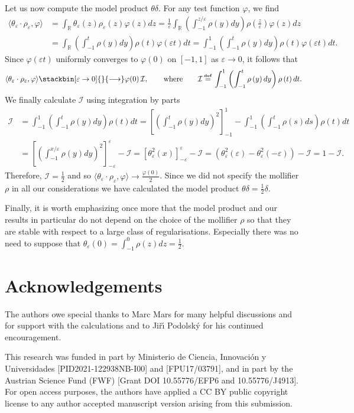 \documentclass[11pt]{article}
\numberwithin{equation}{section}
\def\defi{{\stackrel{\mbox{\tiny {\textbf{def}}}}{\,\, = \,\, }}}
\newcommand{\nn}{\nonumber}
\def\defi{{\stackrel{\mbox{\tiny \textup{\textbf{def}}}}{\,\, = \,\, }}}
\newcommand{\nfi}{\varphi}
\newcommand{\eps}{\varepsilon}
\newcommand{\lp}{\left(}
\newcommand{\rp}{\right)}
\newcommand{\lc}{\left[}
\newcommand{\rc}{\right]}
\newcommand{\la}{\langle}
\newcommand{\ra}{\rangle}
\begin{document}
Let us now compute the model product $\theta\delta$. For any test function $\nfi $, we find
\begin{align}
\nn \la \theta_{\eps}\cdot\rho_{\eps},\nfi\ra&=\int_{\mathbb{R}}\theta_{\eps}(z)\rho_{\eps}(z)\nfi(z)dz=\frac{1}{\eps}\int_{\mathbb{R}}\lp \int_{-1}^{z/\eps}\rho\lp y\rp  dy\rp\rho\lp\frac{z}{\eps}\rp\nfi(z)dz\\
\label{app:A:eq0}&=\int_{\mathbb{R}}\lp \int_{-1}^{ t}\rho\lp y\rp  dy\rp\rho\lp t\rp\nfi(\eps t) dt=\int_{-1}^1\lp \int_{-1}^{ t}\rho\lp y\rp  dy\rp\rho\lp t\rp\nfi(\eps t) dt.
\end{align}
Since $\nfi(\eps t)$ uniformly converges to $\nfi(0)$ on $[-1,1]$ as $\eps\to 0$, it follows that 
\begin{align}
\la \theta_{\eps}\cdot\rho_{\eps},\nfi\ra\stackbin[\eps\rightarrow0]{}{\longrightarrow}\nfi(0)\, \mathcal{I},\qquad \textup{where}\qquad \mathcal{I}\defi \int_{-1}^1\lp \int_{-1}^{ t}\rho\lp y\rp  dy\rp\rho\lp t\rp dt.
\end{align} 
We finally calculate $\mathcal{I}$ using integration by parts
\begin{align}
\nn \mathcal{I}&= \int_{-1}^1\lp \int_{-1}^{ t}\rho\lp y\rp  dy\rp\rho\lp t\rp dt=\lc\lp \int_{-1}^{ t}\rho\lp y\rp  dy \rp^2 \rc^1_{-1}-\int_{-1}^1 \lp \int_{-1}^t \rho(s)ds\rp \rho\lp t\rp  dt\\
\label{app:A:eq1}&=\lc \lp \int_{-1}^{ x/\eps}\rho\lp y\rp  dy \rp^2 \rc^{\eps}_{-\eps}-\mathcal{I}=\lc \theta_{\eps}^2(x) \rc^{\eps}_{-\eps}-\mathcal{I}=\lp \theta_{\eps}^2(\eps)-\theta_{\eps}^2(-\eps) \rp-\mathcal{I}=1-\mathcal{I}.
\end{align}
Therefore, $\mathcal{I}=\frac{1}{2}$ and so $\la \theta_{\eps}\cdot\rho_{\eps},\nfi\ra\to \frac{\nfi(0)}{2}$. Since we did not specify the mollifier $\rho$ in all our considerations we have calculated the model product $\theta\delta=\frac{1}{2}\delta$. 

Finally, it is worth emphasizing once more that 
the model product and our results in particular do not depend on the choice of the mollifier $\rho$ so that they are stable with respect to a large class of regularisations. Especially there was no need to suppose that $\theta_{\eps}(0)=\int_{-1}^0\rho(z)dz=\frac{1}{2}$.






\section*{Acknowledgements}
The authors owe special thanks to Marc Mars for many helpful discussions and for support with the calculations and to Ji\v{r}\'{\i} Podolsk\'{y} for his continued encouragement.

This research was funded in part by Ministerio de Ciencia, Innovaci{\'o}n y Universidades [PID2021-122938NB-I00] and [FPU17/03791], and in part by the Austrian Science Fund (FWF) [Grant DOI 10.55776/EFP6 and 10.55776/J4913]. For open access purposes, the authors have applied a CC BY public copyright license to any author accepted manuscript version arising from this submission.


\begingroup
\let\itshape\upshape


\end{document}
